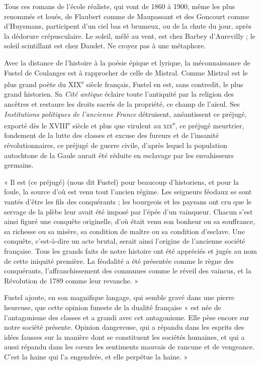 \documentclass[french,twoside]{book} %
\begin{document}
Tous ces romans de l’école réaliste, qui vont de 1860 à 1900, même les plus renommés et loués, de Flaubert comme de Maupassant et des Goncourt comme d’Huysmans, participent d’un ciel bas et brumeux, ou de la chute du jour, après la dédorure crépusculaire. Le soleil, mêlé au vent, est chez Barbey d’Aurevilly ; le soleil scintillant est chez Daudet. Ne croyez pas à une métaphore.\par
Avec la distance de l’histoire à la poésie épique et lyrique, la méconnaissance de Fustel de Coulanges est à rapprocher de celle de Mistral. Comme Mistral est le plus grand poète du XIX\textsuperscript{e} siècle français, Fustel en est, sans contredit, le plus grand historien. Sa {\itshape Cité antique} éclaire toute l’antiquité par la religion des ancêtres et restaure les droits sacrés de la propriété, ce champ de l’aïeul. Ses {\itshape Institutions politiques de l’ancienne France} détruisent, anéantissent ce préjugé, exporté dès le XVIII\textsuperscript{e} siècle et plus que virulent au \textsc{xix}\textsuperscript{e}, ce préjugé meurtrier, fondement de la lutte des classes et excuse des fureurs et de l’insanité révolutionnaires, ce préjugé de guerre civile, d’après lequel la population autochtone de la Gaule aurait été réduite en esclavage par les envahisseurs germains.\par
« Il est (ce préjugé) (nous dit Fustel) pour beaucoup d’historiens, et pour la foule, la source d’où est venu tout l’ancien régime. Les seigneurs féodaux se sont vantés d’être les fils des conquérants ; les bourgeois et les paysans ont cru que le servage de la plèbe leur avait été imposé par l’épée d’un vainqueur. Chacun s’est ainsi figuré une conquête originelle, d’où était venu son bonheur ou sa souffrance, sa richesse ou sa misère, sa condition de maître ou sa condition d’esclave. Une conquête, c’est-à-dire un acte brutal, serait ainsi l’origine de l’ancienne société française. Tous les grands faits de notre histoire ont été appréciés et jugés au nom de cette iniquité première. La féodalité a été présentée comme le règne des conquérants, l’affranchissement des communes comme le réveil des vaincus, et la Révolution de 1789 comme leur revanche. »\par
Fustel ajoute, en son magnifique langage, qui semble gravé dans une pierre heureuse, que cette opinion funeste de la dualité française « est née de l’antagonisme des classes et a grandi avec cet antagonisme. Elle pèse encore sur notre société présente. Opinion dangereuse, qui a répandu dans les esprits des idées fausses sur la manière dont se constituent les sociétés humaines, et qui a aussi répandu dans les cœurs les sentiments mauvais de rancune et de vengeance. C’est la haine qui l’a engendrée, et elle perpétue la haine. »\par
\end{document}
